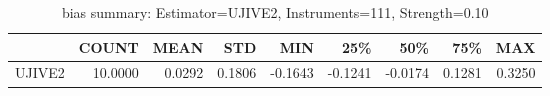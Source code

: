 \begin{table}[ht]
\centering
\caption{bias summary: Estimator=UJIVE2, Instruments=111, Strength=0.10}
\begin{tabular}{lrrrrrrrr}
\toprule
 & COUNT & MEAN & STD & MIN & 25\% & 50\% & 75\% & MAX \\
\midrule
UJIVE2 & 10.0000 & 0.0292 & 0.1806 & -0.1643 & -0.1241 & -0.0174 & 0.1281 & 0.3250 \\
\bottomrule
\end{tabular}
\end{table}
